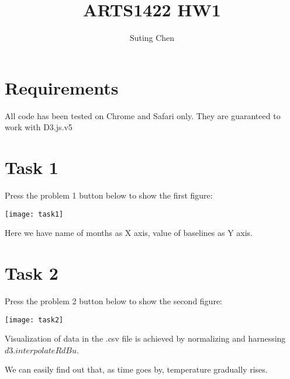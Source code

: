 \documentclass[]{article}
\title{ARTS1422 HW1}
\author{Suting Chen}
\begin{document}
\maketitle

\section{Requirements}
All code has been tested on Chrome and Safari only. They are guaranteed to work with D3.js.v5

\section{Task 1}
Press the problem 1 button below to show the first figure: 
\begin{center}
\texttt{[image: task1]}
\end{center}
Here we have name of months as X axis, value of baselines as Y axis.

\newpage

\section{Task 2}
Press the problem 2 button below to show the second figure: 
\begin{center}
	\texttt{[image: task2]}
\end{center}
Visualization of data in the .csv file is achieved by normalizing and harnessing $d3.interpolateRdBu$.

We can easily find out that, as time goes by, temperature gradually rises.
\end{document}
